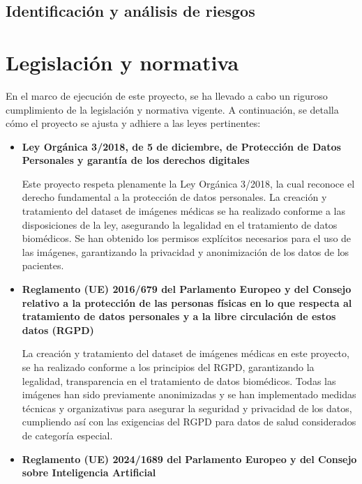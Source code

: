 \documentclass[12pt,a4paper,onecolumn,oneside]{report}
\begin{document}
\subsection{Identificación y análisis de riesgos}

\clearpage
\section{Legislación y normativa}
\label{Legislación y normativa}

En el marco de ejecución de este proyecto, se ha llevado a cabo un riguroso cumplimiento de la legislación y normativa vigente. A continuación, 
se detalla cómo el proyecto se ajusta y adhiere a las leyes pertinentes:

\begin{itemize}
    \item \textbf{Ley Orgánica 3/2018, de 5 de diciembre, de Protección de Datos Personales y garantía de los derechos digitales}\cite{LOPD2018}
    
    Este proyecto respeta plenamente la Ley Orgánica 3/2018, la cual reconoce el derecho fundamental a la protección de datos personales. 
    La creación y tratamiento del dataset de imágenes médicas se ha realizado conforme a las disposiciones de la ley, asegurando la legalidad en el tratamiento de datos biomédicos. 
    Se han obtenido los permisos explícitos necesarios para el uso de las imágenes, garantizando la privacidad y anonimización de los datos de los pacientes. 
    
    \item \textbf{Reglamento (UE) 2016/679 del Parlamento Europeo y del Consejo relativo a la protección de las personas físicas en lo que respecta al tratamiento de datos personales y a la libre circulación de estos datos (RGPD)}\cite{RGPD2016}

    La creación y tratamiento del dataset de imágenes médicas en este proyecto, se ha realizado conforme a los principios del RGPD, garantizando la legalidad, transparencia en el 
    tratamiento de datos biomédicos. Todas las imágenes han sido previamente anonimizadas y se han implementado medidas técnicas y organizativas 
    para asegurar la seguridad y privacidad de los datos, cumpliendo así con las exigencias del RGPD para datos de salud considerados de categoría 
    especial.
    
    \item \textbf{Reglamento (UE) 2024/1689 del Parlamento Europeo y del Consejo sobre Inteligencia Artificial}\cite{ReglamentoIA2024}


\end{itemize}
\end{document}
